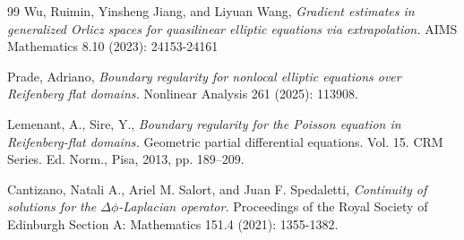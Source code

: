 \documentclass[11pt, leqno]{article}
\theoremstyle{definition}
\theoremstyle{remark}
\numberwithin{equation}{section}
\begin{document}
\begin{thebibliography}{99}
 Wu, Ruimin, Yinsheng Jiang, and Liyuan Wang, {\it Gradient estimates in generalized Orlicz spaces for quasilinear elliptic equations via extrapolation.} AIMS Mathematics 8.10 (2023): 24153-24161

 Prade, Adriano, {\it Boundary regularity for nonlocal elliptic equations over Reifenberg flat domains.} Nonlinear Analysis 261 (2025): 113908.


 Lemenant, A., Sire, Y., {\it Boundary regularity for the Poisson equation in Reifenberg-flat domains.} Geometric partial differential equations. Vol. 15. CRM Series. Ed. Norm., Pisa, 2013, pp. 189–209.

 Cantizano, Natali A., Ariel M. Salort, and Juan F. Spedaletti, {\it Continuity of solutions for the $\Delta\phi$-Laplacian operator.} Proceedings of the Royal Society of Edinburgh Section A: Mathematics 151.4 (2021): 1355-1382.








\end{thebibliography}
	
	
\end{document}
